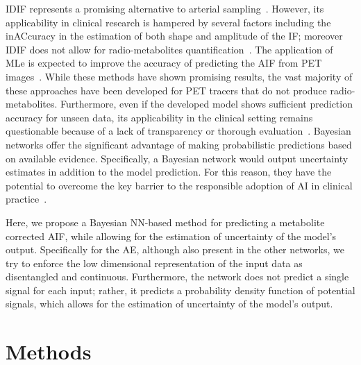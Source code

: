         \gls{IDIF} represents a promising alternative to arterial sampling~\cite{Zanotti-Fregonara2011}. However, its applicability in clinical research is hampered by several factors including the inACcuracy in the estimation of both shape and amplitude of the \gls{IF}; moreover \gls{IDIF} does not allow for radio-metabolites quantification~\cite{Sari2018Non-invasive11C-SB201745}. The application of \gls{MLe} is expected to improve the accuracy of predicting the \gls{AIF} from \gls{PET} images~\cite{Kuttner2020, Ferrante2022PhysicallyImaging}. While these methods have shown promising results, the vast majority of these approaches have been developed for \gls{PET} tracers that do not produce radio-metabolites. Furthermore, even if the developed model shows sufficient prediction accuracy for unseen data, its applicability in the clinical setting remains questionable because of a lack of transparency or thorough evaluation~\cite{Salahuddin2022TransparencyMethods}. Bayesian networks offer the significant advantage of making probabilistic predictions based on available evidence. Specifically, a Bayesian network would output uncertainty estimates in addition to the model prediction. For this reason, they have the potential to overcome the key barrier to the responsible adoption of \gls{AI} in clinical practice~\cite{Prabhudesai2023LoweringAI}. 
        
        Here, we propose a Bayesian \gls{NN}-based method for predicting a metabolite corrected \gls{AIF}, while allowing for the estimation of uncertainty of the model's output. Specifically for the \gls{AE}, although also present in the other networks, we try to enforce the low dimensional representation of the input data as disentangled and continuous. Furthermore, the network does not predict a single signal for each input; rather, it predicts a probability density function of potential signals, which allows for the estimation of uncertainty of the model's output.
        
    \section{Methods}\label{sec:a_bayesian_neural_network-based_method_for_the_extraction_of_a_metabolite_corrected_arterial_input_function_from_dynamic_pbr28_pet_appendix_methods}
